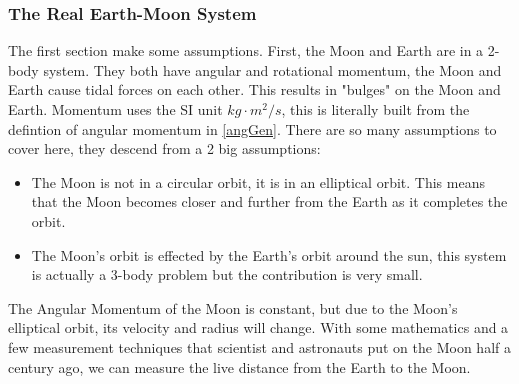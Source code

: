 \documentclass[12pt,oneside,a4paper,english]{article}
\begin{document}
\subsubsection{The Real Earth-Moon System}
The first section make some assumptions. First, the Moon and Earth are in a 2-body system. They both have angular and rotational momentum, the Moon and Earth cause tidal forces on each other. This results in "bulges" on the Moon and Earth. Momentum uses the SI unit $kg \cdot m^2/s$, this is literally built from the defintion of angular momentum in \ref{angGen}. There are so many assumptions to cover here, they descend from a 2 big assumptions:
\begin{itemize}
    \item The Moon is not in a circular orbit, it is in an elliptical orbit. This means that the Moon becomes closer and further from the Earth as it completes the orbit.
    \item The Moon's orbit is effected by the Earth's orbit around the sun, this system is actually a 3-body problem but the contribution is very small.
\end{itemize}
The Angular Momentum of the Moon is constant, but due to the Moon's elliptical orbit, its velocity and radius will change. With some mathematics and a few measurement techniques that scientist and astronauts put on the Moon half a century ago, we can measure the live distance from the Earth to the Moon.
\end{document}
